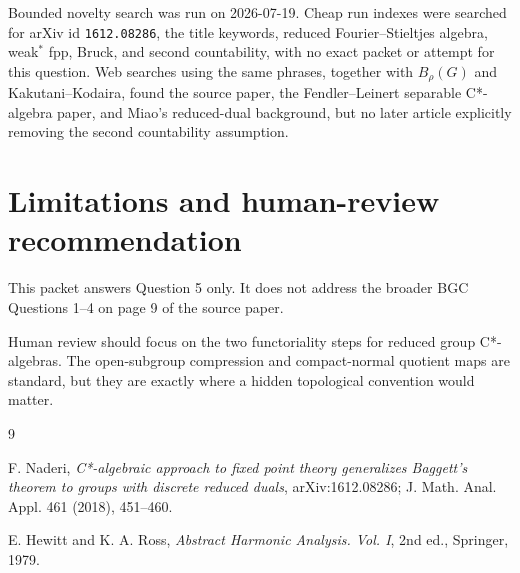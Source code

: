 \documentclass[11pt]{article}
\begin{document}
Bounded novelty search was run on 2026-07-19.  Cheap run indexes were searched
for arXiv id \texttt{1612.08286}, the title keywords, reduced
Fourier--Stieltjes algebra, weak\(^*\) fpp, Bruck, and second countability,
with no exact packet or attempt for this question.  Web searches using the
same phrases, together with \(B_\rho(G)\) and Kakutani--Kodaira, found the
source paper, the Fendler--Leinert separable C*-algebra paper, and Miao's
reduced-dual background, but no later article explicitly removing the second
countability assumption.

\section*{Limitations and human-review recommendation}

This packet answers Question 5 only.  It does not address the broader BGC
Questions 1--4 on page 9 of the source paper.

Human review should focus on the two functoriality steps for reduced group
C*-algebras.  The open-subgroup compression and compact-normal quotient maps
are standard, but they are exactly where a hidden topological convention would
matter.

\begin{thebibliography}{9}

F. Naderi,
\emph{C*-algebraic approach to fixed point theory generalizes Baggett's theorem
to groups with discrete reduced duals},
arXiv:1612.08286; J. Math. Anal. Appl. 461 (2018), 451--460.

E. Hewitt and K. A. Ross,
\emph{Abstract Harmonic Analysis. Vol. I},
2nd ed., Springer, 1979.

\end{thebibliography}
\end{document}
